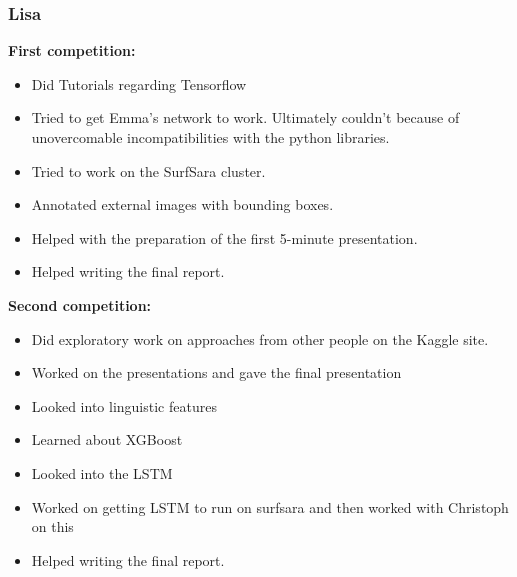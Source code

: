 \documentclass[a4paper]{article}
\begin{document}
\subsubsection*{Lisa}

\textbf{First competition:}

\begin{itemize}
	\item Did Tutorials regarding Tensorflow
	\item Tried to get Emma’s network to work. Ultimately couldn’t because of unovercomable incompatibilities with the python libraries.
	\item Tried to work on the SurfSara cluster.
	\item Annotated external images with bounding boxes.
	\item Helped with the preparation of the first 5-minute presentation.
	\item Helped writing the final report.
\end{itemize}

\noindent\textbf{Second competition:}

\begin{itemize}
	\item Did exploratory work on approaches from other people on the Kaggle site.
	\item Worked on the presentations and gave the final presentation
	\item Looked into linguistic features
	\item Learned about XGBoost
	\item Looked into the LSTM
	\item Worked on getting LSTM to run on surfsara and then worked with Christoph on this
	\item Helped writing the final report.
\end{itemize}
\end{document}

